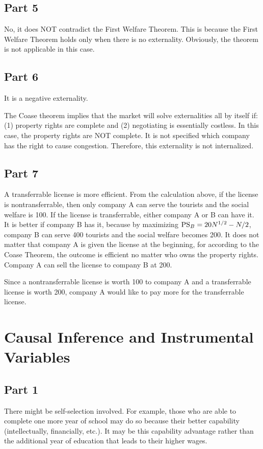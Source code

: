 \documentclass{article}
\begin{document}
\subsection{Part 5}
No, it does NOT contradict the First Welfare Theorem. This is because the First Welfare Theorem holds only when there is no externality. Obviously, the theorem is not applicable in this case.

\subsection{Part 6}
It is a negative externality.

The Coase theorem implies that the market will solve externalities all by itself if: (1) property rights are complete and (2) negotiating is essentially costless. In this case, the property rights are NOT complete. It is not specified which company has the right to cause congestion. Therefore, this externality is not internalized.

\subsection{Part 7}
A transferrable license is more efficient. From the calculation above, if the license is nontransferrable, then only company A can serve the tourists and the social welfare is 100. If the license is transferrable, either company A or B can have it. It is better if company B has it, because by maximizing $\textup{PS}_B=20N^{1/2}-N/2$, company B can serve 400 tourists and the social welfare becomes 200. It does not matter that company A is given the license at the beginning, for according to the Coase Theorem, the outcome is efficient no matter who owns the property rights. Company A can sell the license to company B at 200.

Since a nontransferrable license is worth 100 to company A and a transferrable license is worth 200, company A would like to pay more for the transferrable license.

\section{Causal Inference and Instrumental Variables}
\subsection{Part 1}
There might be self-selection involved. For example, those who are able to complete one more year of school may do so because their better capability (intellectually, financially, etc.). It may be this capability advantage rather than the additional year of education that leads to their higher wages.
\end{document}
